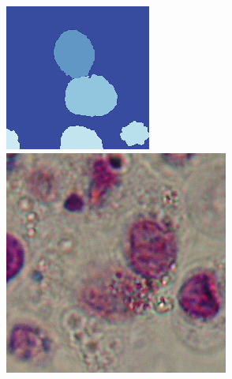 \begin{figure}[b!]
	\includegraphics[width=0.97\linewidth]{Figures/Chapter2/6c1.png}
	\endminipage\hfill
	\centering	
	\includegraphics[width=0.97\linewidth]{Figures/Chapter2/6a2.png}	

\end{figure}
